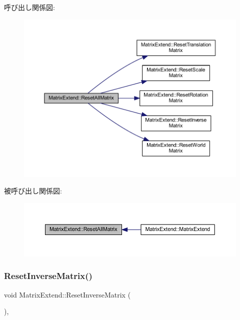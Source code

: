 呼び出し関係図\+:\nopagebreak
\begin{figure}[H]
\begin{center}
\leavevmode
\includegraphics[width=350pt]{class_matrix_extend_a81db064716c74390d9c4b7e1022a4b27_cgraph}
\end{center}
\end{figure}
被呼び出し関係図\+:\nopagebreak
\begin{figure}[H]
\begin{center}
\leavevmode
\includegraphics[width=350pt]{class_matrix_extend_a81db064716c74390d9c4b7e1022a4b27_icgraph}
\end{center}
\end{figure}
\mbox{\label{class_matrix_extend_a14f5cf7ced273e96c238cc416d0719ac}} 
\subsubsection{\texorpdfstring{Reset\+Inverse\+Matrix()}{ResetInverseMatrix()}}
{\footnotesize\ttfamily void Matrix\+Extend\+::\+Reset\+Inverse\+Matrix (\begin{DoxyParamCaption}{ }\end{DoxyParamCaption})\hspace{0.3cm}{\ttfamily [inline]}, {\ttfamily [private]}}



